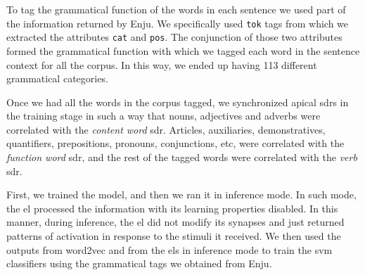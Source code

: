 {To tag the grammatical function of the words in each sentence we used part of the information returned by Enju. We specifically used \texttt{tok} tags from which we extracted the attributes \texttt{cat} and \texttt{pos}. The conjunction of those two attributes formed the grammatical function with which we tagged each word in the sentence context for all the corpus. In this way, we ended up having 113 different grammatical categories. 

Once we had all the words in the corpus tagged, we synchronized apical \glspl{sdr} in the training stage in such a way that nouns, adjectives and adverbs were correlated with the \emph{content word} \gls{sdr}. Articles, auxiliaries, demonstratives, quantifiers, prepositions, pronouns, conjunctions, etc, were correlated with the \emph{function word} \gls{sdr}, and the rest of the tagged words were correlated with the \emph{verb} \gls{sdr}.

First, we trained the model, and then we ran it in inference mode. In such mode, the \gls{el} processed the information with its learning properties disabled. In this manner, during inference, the \gls{el} did not modify its synapses and just returned patterns of activation in response to the stimuli it received. We then used the outputs from word2vec and from the \glspl{el} in inference mode to train the \gls{svm} classifiers using the grammatical tags we obtained from Enju.
}






















